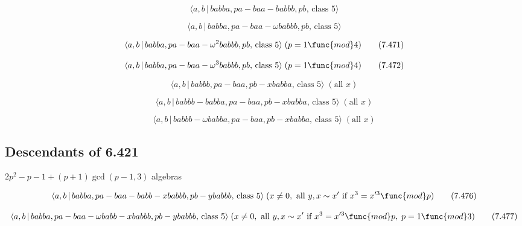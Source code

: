 \documentclass[10pt]{article}
\begin{document}
\begin{equation}
\langle a,b\,|\,babba,pa-baa-babbb,pb,\,\text{class }5\rangle  \tag{7.469}
\end{equation}

\begin{equation}
\langle a,b\,|\,babba,pa-baa-\omega babbb,pb,\,\text{class }5\rangle 
\tag{7.470}
\end{equation}

\begin{equation}
\langle a,b\,|\,babba,pa-baa-\omega ^{2}babbb,pb,\,\text{class }5\rangle
\;(p=1\func{mod}4)  \tag{7.471}
\end{equation}

\begin{equation}
\langle a,b\,|\,babba,pa-baa-\omega ^{3}babbb,pb,\,\text{class }5\rangle
\;(p=1\func{mod}4)  \tag{7.472}
\end{equation}

\begin{equation}
\langle a,b\,|\,babbb,pa-baa,pb-xbabba,\,\text{class }5\rangle \;(\text{all }%
x)  \tag{7.473}
\end{equation}

\begin{equation}
\langle a,b\,|\,babbb-babba,pa-baa,pb-xbabba,\,\text{class }5\rangle \;(%
\text{all }x)  \tag{7.474}
\end{equation}

\begin{equation}
\langle a,b\,|\,babbb-\omega babba,pa-baa,pb-xbabba,\,\text{class }5\rangle
\;(\text{all }x)  \tag{7.475}
\end{equation}

\subsection{Descendants of 6.421}

$2p^{2}-p-1+(p+1)\gcd (p-1,3)$ algebras

\begin{equation}
\langle a,b\,|\,babba,pa-baa-babb-xbabbb,pb-ybabbb,\,\text{class }5\rangle
\;(x\neq 0,\text{ all }y,x \sim x^{\prime }\text{ if }x^3=x^{\prime 3}\func{%
mod}p)  \tag{7.476}
\end{equation}

\begin{equation}
\langle a,b\,|\,babba,pa-baa-\omega babb-xbabbb,pb-ybabbb,\,\text{class }%
5\rangle \;(x\neq 0,\text{ all }y,x \sim x^{\prime }\text{ if }x^3=x^{\prime
3}\func{mod}p,\;p=1\func{mod}3)  \tag{7.477}
\end{equation}
\end{document}
